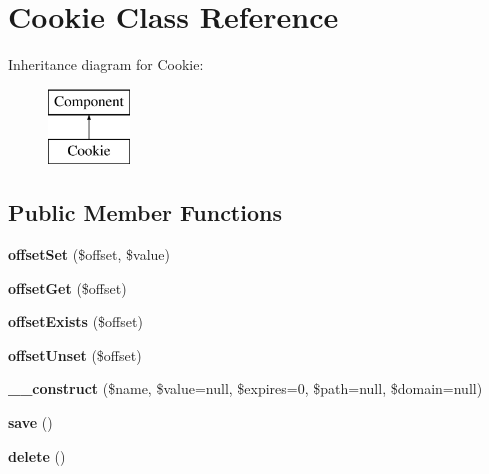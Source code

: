 \hypertarget{classCookie}{
\section{Cookie Class Reference}
\label{classCookie}
}
Inheritance diagram for Cookie:\begin{figure}[H]
\begin{center}
\leavevmode
\includegraphics[height=2.000000cm]{classCookie}
\end{center}
\end{figure}
\subsection*{Public Member Functions}
\begin{DoxyCompactItemize}
\item 
\hypertarget{classCookie_a2d6eea6280981d7ab703772681f7a4aa}{
{\bfseries offsetSet} (\$offset, \$value)}
\label{classCookie_a2d6eea6280981d7ab703772681f7a4aa}

\item 
\hypertarget{classCookie_a17b6835c4e468e34741bd9ad4fa87fb5}{
{\bfseries offsetGet} (\$offset)}
\label{classCookie_a17b6835c4e468e34741bd9ad4fa87fb5}

\item 
\hypertarget{classCookie_aa473c0ae3cb07717be9b5b00aa59fe29}{
{\bfseries offsetExists} (\$offset)}
\label{classCookie_aa473c0ae3cb07717be9b5b00aa59fe29}

\item 
\hypertarget{classCookie_a076e18a6028d8cd5843060893e04e041}{
{\bfseries offsetUnset} (\$offset)}
\label{classCookie_a076e18a6028d8cd5843060893e04e041}

\item 
\hypertarget{classCookie_a2828d63c15838b350737e2be73be3ffa}{
{\bfseries \_\-\_\-construct} (\$name, \$value=null, \$expires=0, \$path=null, \$domain=null)}
\label{classCookie_a2828d63c15838b350737e2be73be3ffa}

\item 
\hypertarget{classCookie_a60f4d95767941d94c6fd06127f78af46}{
{\bfseries save} ()}
\label{classCookie_a60f4d95767941d94c6fd06127f78af46}

\item 
\hypertarget{classCookie_aaee9cc15f98661c022dc2728b48fa3a2}{
{\bfseries delete} ()}
\label{classCookie_aaee9cc15f98661c022dc2728b48fa3a2}

\end{DoxyCompactItemize}
